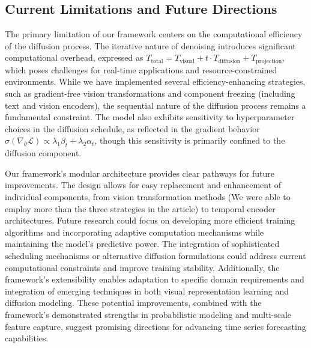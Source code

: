 \subsection{Current Limitations and Future Directions}
The primary limitation of our framework centers on the computational efficiency of the diffusion process. The iterative nature of denoising introduces significant computational overhead, expressed as $T_{\text{total}} = T_{\text{visual}} + t \cdot T_{\text{diffusion}} + T_{\text{projection}}$, which poses challenges for real-time applications and resource-constrained environments. While we have implemented several efficiency-enhancing strategies, such as gradient-free vision transformations and component freezing (including text and vision encoders), the sequential nature of the diffusion process remains a fundamental constraint. The model also exhibits sensitivity to hyperparameter choices in the diffusion schedule, as reflected in the gradient behavior $\sigma(\nabla_\theta \mathcal{L}) \propto \lambda_1\beta_t + \lambda_2\alpha_t$, though this sensitivity is primarily confined to the diffusion component.

Our framework's modular architecture provides clear pathways for future improvements. The design allows for easy replacement and enhancement of individual components, from vision transformation methods (We were able to employ more than the three strategies in the article) to temporal encoder architectures. Future research could focus on developing more efficient training algorithms and incorporating adaptive computation mechanisms while maintaining the model's predictive power. The integration of sophisticated scheduling mechanisms or alternative diffusion formulations could address current computational constraints and improve training stability. Additionally, the framework's extensibility enables adaptation to specific domain requirements and integration of emerging techniques in both visual representation learning and diffusion modeling. These potential improvements, combined with the framework's demonstrated strengths in probabilistic modeling and multi-scale feature capture, suggest promising directions for advancing time series forecasting capabilities.